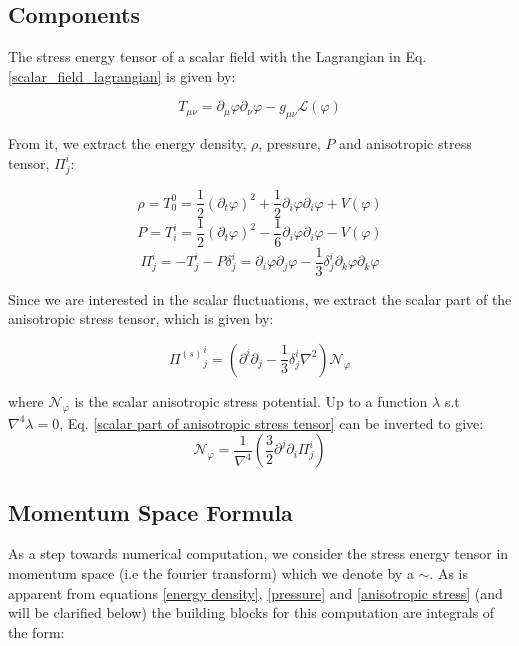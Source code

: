 \documentclass{article}
\begin{document}
\subsection{Components}
The stress energy tensor of a scalar field with the Lagrangian in Eq. \ref{scalar_field_lagrangian}
is given by:

\begin{equation} \label{Stress-Energy-Tensor}
    T_{\mu\nu} = \partial_\mu \varphi \partial_\nu \varphi - g_{\mu\nu}\mathcal{L}(\varphi)
\end{equation}

From it, we extract the energy density, $\rho$, pressure, $P$ and anisotropic stress tensor, $\Pi^i_j$:

\begin{equation} \label{energy density}
    \rho = T^0_0 = \frac{1}{2}(\partial_t\varphi)^2 + \frac{1}{2}\partial_i\varphi\partial_i\varphi + V(\varphi)
\end{equation}
\begin{equation} \label{pressure}
    P = T^i_i = \frac{1}{2}(\partial_t \varphi) ^2 - \frac{1}{6}\partial_i\varphi\partial_i\varphi - V(\varphi)
\end{equation}
\begin{equation}\label{anisotropic stress}
    \Pi^i_j=-T^i_j-P\delta^i_j=\partial_i\varphi \partial_j\varphi-\frac{1}{3}\delta^i_j\partial_k\varphi\partial_k\varphi
\end{equation}

Since we are interested in the scalar fluctuations, we extract the scalar
part of the anisotropic stress tensor, which is given by:

\begin{equation} \label{scalar part of anisotropic stress tensor}
    {\Pi^{(s)}}^i_j = (\partial^i\partial_j-\frac{1}{3}\delta^i_j\nabla^2)\mathcal{N}_\varphi
\end{equation}

where $\mathcal{N}_\varphi$ is the scalar anisotropic stress potential.
Up to a function $\lambda$ s.t $\nabla^4\lambda = 0$, Eq. \ref{scalar part of anisotropic stress tensor} can be inverted to give:
\begin{equation}
    \mathcal{N}_\varphi =\frac{1}{\nabla^4}(\frac{3}{2}\partial^j\partial_i\Pi^i_j)
\end{equation}

\subsection{Momentum Space Formula}
As a step towards numerical computation, we consider the 
stress energy tensor in momentum space (i.e the fourier transform) which we denote by a $\sim$.
As is apparent from equations \ref{energy density}, \ref{pressure} and \ref{anisotropic stress} (and will be clarified below)
the building blocks for this computation are integrals of the form:
\end{document}
